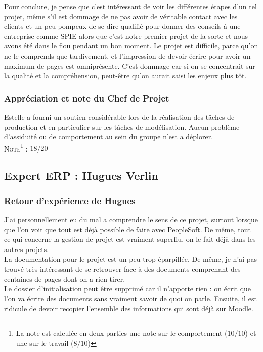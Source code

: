 Pour conclure, je pense que c’est intéressant de voir les différentes étapes d’un tel projet, même s’il est dommage de ne pas avoir de véritable contact avec les clients et un peu pompeux de se dire qualifié pour donner des conseils à une entreprise comme SPIE alors que c’est notre premier projet de la sorte et nous avons été dans le flou pendant un bon moment. Le projet est difficile, parce qu’on ne le comprends que tardivement, et l’impression de devoir écrire pour avoir un maximum de pages est omniprésente. C’est dommage car si on se concentrait sur la qualité et la compréhension, peut-être qu’on aurait saisi les enjeux plus tôt.

\subsubsection{Appréciation et note du Chef de Projet}

Estelle a fourni un soutien considérable lors de la réalisation des tâches de production et en particulier sur les tâches de modélisation. Aucun problème d’assiduité ou de comportement au sein du groupe n’est a déplorer.\\

\noindent\textsc{Note\footnote{La note est calculée en deux parties une note sur le comportement ($10/10$) et une sur le travail ($8/10$)} :} $18/20$

\subsection{Expert ERP : Hugues Verlin}

\subsubsection{Retour d'expérience de Hugues}

J'ai personnellement eu du mal a comprendre le sens de ce projet, surtout lorsque que l’on voit que tout est déjà possible de faire avec PeopleSoft. De même, tout ce qui concerne la gestion de projet est vraiment superflu, on le fait déjà dans les autres projets. \\

La documentation pour le projet est un peu trop éparpillée. De même, je n’ai pas trouvé très intéressant de se retrouver face à des documents comprenant des centaines de pages dont on a rien tirer. \\

Le dossier d’initialisation peut être supprimé car il n’apporte rien : on écrit que l’on va écrire des documents sans vraiment savoir de quoi on parle. Ensuite, il est ridicule de devoir recopier l’ensemble des informations qui sont déjà sur Moodle. \\

